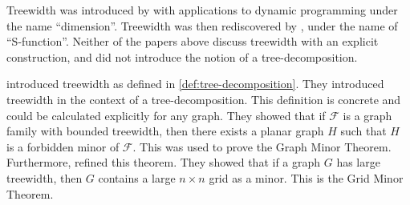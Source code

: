 Treewidth was introduced by \textcite{berteleChapterEliminationVariables1972} with applications to dynamic programming under the name ``dimension''. Treewidth was then rediscovered by \textcite{halinSfunctionsGraphs1976}, under the name of ``S-function''. Neither of the papers above discuss treewidth with an explicit construction, and did not introduce the notion of a tree-decomposition.

\textcite{robertsonGraphMinorsIII1984} introduced treewidth as defined in \cref{def:tree-decomposition}. They introduced treewidth in the context of a tree-decomposition. This definition is concrete and could be calculated explicitly for any graph. They showed that if $\mathcal{F}$ is a graph family with bounded treewidth, then there exists a planar graph $H$ such that $H$ is a forbidden minor of $\mathcal{F}$. This was used to prove the Graph Minor Theorem. Furthermore, \textcite{robertsonQuicklyExcludingPlanar1994} refined this theorem. They showed that if a graph $G$ has large treewidth, then $G$ contains a large $n \times n$ grid as a minor. This is the Grid Minor Theorem.